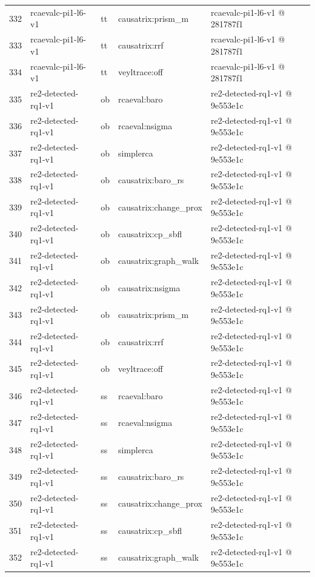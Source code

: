 \begin{longtable}{@{}r>{\raggedright\arraybackslash}p{87.0pt}>{\raggedright\arraybackslash}p{18.0pt}>{\raggedright\arraybackslash}p{63.0pt}>{\raggedright\arraybackslash}p{108.0pt}@{}}
332 & rcaevalc-pi1-l6-v1 & tt & causatrix:prism\_m & rcaevalc-pi1-l6-v1 @ 281787f1 \\
333 & rcaevalc-pi1-l6-v1 & tt & causatrix:rrf & rcaevalc-pi1-l6-v1 @ 281787f1 \\
334 & rcaevalc-pi1-l6-v1 & tt & veyltrace:off & rcaevalc-pi1-l6-v1 @ 281787f1 \\
335 & re2-detected-rq1-v1 & ob & rcaeval:baro & re2-detected-rq1-v1 @ 9e553e1c \\
336 & re2-detected-rq1-v1 & ob & rcaeval:nsigma & re2-detected-rq1-v1 @ 9e553e1c \\
337 & re2-detected-rq1-v1 & ob & simplerca & re2-detected-rq1-v1 @ 9e553e1c \\
338 & re2-detected-rq1-v1 & ob & causatrix:baro\_rs & re2-detected-rq1-v1 @ 9e553e1c \\
339 & re2-detected-rq1-v1 & ob & causatrix:change\_prox & re2-detected-rq1-v1 @ 9e553e1c \\
340 & re2-detected-rq1-v1 & ob & causatrix:cp\_sbfl & re2-detected-rq1-v1 @ 9e553e1c \\
341 & re2-detected-rq1-v1 & ob & causatrix:graph\_walk & re2-detected-rq1-v1 @ 9e553e1c \\
342 & re2-detected-rq1-v1 & ob & causatrix:nsigma & re2-detected-rq1-v1 @ 9e553e1c \\
343 & re2-detected-rq1-v1 & ob & causatrix:prism\_m & re2-detected-rq1-v1 @ 9e553e1c \\
344 & re2-detected-rq1-v1 & ob & causatrix:rrf & re2-detected-rq1-v1 @ 9e553e1c \\
345 & re2-detected-rq1-v1 & ob & veyltrace:off & re2-detected-rq1-v1 @ 9e553e1c \\
346 & re2-detected-rq1-v1 & ss & rcaeval:baro & re2-detected-rq1-v1 @ 9e553e1c \\
347 & re2-detected-rq1-v1 & ss & rcaeval:nsigma & re2-detected-rq1-v1 @ 9e553e1c \\
348 & re2-detected-rq1-v1 & ss & simplerca & re2-detected-rq1-v1 @ 9e553e1c \\
349 & re2-detected-rq1-v1 & ss & causatrix:baro\_rs & re2-detected-rq1-v1 @ 9e553e1c \\
350 & re2-detected-rq1-v1 & ss & causatrix:change\_prox & re2-detected-rq1-v1 @ 9e553e1c \\
351 & re2-detected-rq1-v1 & ss & causatrix:cp\_sbfl & re2-detected-rq1-v1 @ 9e553e1c \\
352 & re2-detected-rq1-v1 & ss & causatrix:graph\_walk & re2-detected-rq1-v1 @ 9e553e1c \\

\end{longtable}
